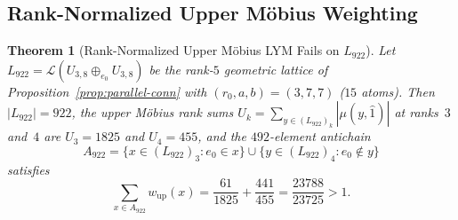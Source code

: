 \documentclass[11pt]{article}
\newtheorem{theorem}{Theorem}[section]
\theoremstyle{definition}
\theoremstyle{remark}
\begin{document}
\subsection{Rank-Normalized Upper M\"obius Weighting}

\begin{theorem}[Rank-Normalized Upper M\"obius LYM Fails on $L_{922}$]\label{thm:L922}
Let $L_{922} = \mathcal{L}(U_{3,8} \oplus_{e_0} U_{3,8})$ be the rank-$5$ geometric lattice of Proposition~\ref{prop:parallel-conn} with $(r_0, a, b) = (3, 7, 7)$ ($15$ atoms). Then $|L_{922}| = 922$, the upper M\"obius rank sums $U_k = \sum_{y \in (L_{922})_k} |\mu(y, \hat{1})|$ at ranks~$3$ and~$4$ are $U_3 = 1825$ and $U_4 = 455$, and the $492$-element antichain
\[
  A_{922} = \bigl\{x \in (L_{922})_3 : e_0 \in x\bigr\} \cup \bigl\{y \in (L_{922})_4 : e_0 \notin y\bigr\}
\]
satisfies
\begin{equation}\label{eq:L922-violation}
  \sum_{x \in A_{922}} w_{\mathrm{up}}(x) = \frac{61}{1825} + \frac{441}{455} = \frac{23788}{23725} > 1.
\end{equation}
\end{theorem}
\end{document}
